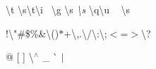 \textbackslash{}t{\itshape } \textbackslash{}s\textbackslash{}t\textbackslash{}i~\newline
\textbackslash{}g {\itshape } \textbackslash{}s{\ttfamily } {\itshape } {\ttfamily } {\itshape \textbackslash{}s} {\itshape } \textbackslash{}q\textbackslash{}u{\itshape } ~\newline
{\ttfamily } {\itshape } \textbackslash{}s

!\textbackslash{}"{}\#\$\%\&\textbackslash{}\textquotesingle{}()$\ast$+\textbackslash{},.\textbackslash{}/\textbackslash{}\+:\textbackslash{};\texorpdfstring{$<$}{<}=\texorpdfstring{$>$}{>}\textbackslash{}?

@ \mbox{[} \mbox{]} \textbackslash{}$^\wedge$ \+\_\+ \`{} $|$ 